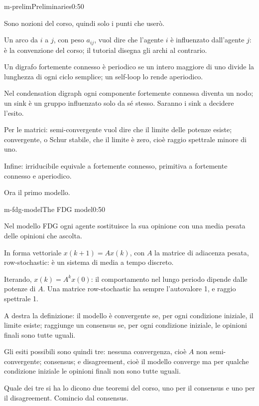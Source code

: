 \begin{slide}{m-prelim}{Preliminaries}{0:50}
  \begin{discorso}
    \item Sono nozioni del corso, quindi solo i punti che userò.
    \item Un arco da $i$ a $j$, con peso $a_{ij}$, vuol dire che l'agente $i$ è influenzato dall'agente $j$: è la convenzione del corso; il tutorial disegna gli archi al contrario.
    \item Un digrafo fortemente connesso è periodico se un intero maggiore di uno divide la lunghezza di ogni ciclo semplice; un self-loop lo rende aperiodico.
    \item Nel condensation digraph ogni componente fortemente connessa diventa un nodo; un sink è un gruppo influenzato solo da sé stesso. Saranno i sink a decidere l'esito.
    \item Per le matrici: semi-convergente vuol dire che il limite delle potenze esiste; convergente, o Schur stabile, che il limite è zero, cioè raggio spettrale minore di uno.
    \item Infine: irriducibile equivale a fortemente connesso, primitiva a fortemente connesso e aperiodico.
    \item Ora il primo modello.
  \end{discorso}
\end{slide}

\begin{slide}{m-fdg-model}{The FDG model}{0:50}
  \begin{discorso}
    \item Nel modello FDG ogni agente sostituisce la sua opinione con una media pesata delle opinioni che ascolta.
    \item In forma vettoriale $x(k+1)=Ax(k)$, con $A$ la matrice di adiacenza pesata, row-stochastic: è un sistema di media a tempo discreto.
    \item Iterando, $x(k)=A^kx(0)$: il comportamento nel lungo periodo dipende dalle potenze di $A$. Una matrice row-stochastic ha sempre l'autovalore 1, e raggio spettrale 1.
    \item A destra la definizione: il modello è convergente se, per ogni condizione iniziale, il limite esiste; raggiunge un consensus se, per ogni condizione iniziale, le opinioni finali sono tutte uguali.
    \item Gli esiti possibili sono quindi tre: nessuna convergenza, cioè $A$ non semi-convergente; consensus; e disagreement, cioè il modello converge ma per qualche condizione iniziale le opinioni finali non sono tutte uguali.
    \item {\color{blue}Quale dei tre si ha lo dicono due teoremi del corso, uno per il consensus e uno per il disagreement. Comincio dal consensus.}
    \item {\color{red}          }
  \end{discorso}
\end{slide}

